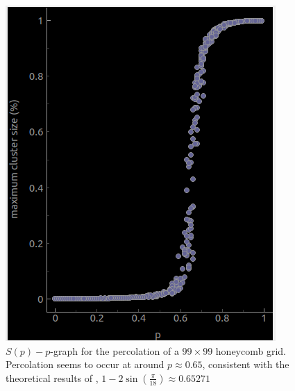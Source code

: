 \documentclass[a4paper,fleqn]{article}
\begin{document}
\begin{figure}[H]
\begin{minipage}{0.3\textwidth}
	\end{minipage}
	\begin{minipage}{0.3\textwidth}		
		\includegraphics*[width=\textwidth]{images/2dhoneycomb}
	\end{minipage}
	\caption{$S(p)-p$-graph for the percolation of a $99\times 99$ honeycomb grid. Percolation seems to occur at around $p \approx 0.65$, consistent with the theoretical results of \cite{Percolation}, $1-2\sin(\frac{\pi}{18}) \approx 0.65271$ }
\end{figure}
\end{document}
